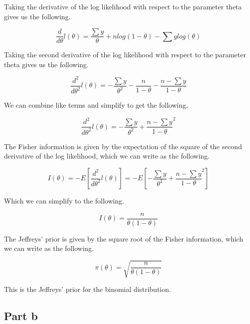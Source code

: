 \documentclass[12pt, letterpaper]{article}
\begin{document}
Taking the derivative of the log likelihood with respect to the parameter theta gives us the following. 

\begin{equation}
  \frac{d}{d\theta}l(\theta) = \frac{\sum y}{\theta} + n log(1 - \theta) - \sum y log(\theta) 
\end{equation} 

Taking the second derivative of the log likelihood with respect to the parameter theta gives us the following. 

\begin{equation}
  \frac{d^2}{d\theta^2}l(\theta) = -\frac{\sum y}{\theta^2} - \frac{n}{1 - \theta} - \frac{n - \sum y}{1 - \theta}
\end{equation} 

We can combine like terms and simplify to get the following. 

\begin{equation}
  \frac{d^2}{d\theta^2}l(\theta) = -\frac{\sum y}{\theta^2} + \frac{n - \sum y}{1 - \theta}^2  
\end{equation} 

The Fisher information is given by the expectation of the square of the second derivative of the log likelihood, which we can write as the following. 

\begin{equation}
  I(\theta) = -E\left[\frac{d^2}{d\theta^2}l(\theta)\right] = -E\left[-\frac{\sum y}{\theta^2} + \frac{n - \sum y}{1 - \theta}^2\right] 
\end{equation} 

Which we can simplify to the following. 

\begin{equation}
  I(\theta) = \frac{n}{\theta(1 - \theta)} 
\end{equation} 

The Jeffreys' prior is given by the square root of the Fisher information, which we can write as the following. 

\begin{equation}
  \pi(\theta) = \sqrt{\frac{n}{\theta(1 - \theta)}} 
\end{equation} 

This is the Jeffreys' prior for the binomial distribution. 

\subsection{Part b} 
\end{document}
